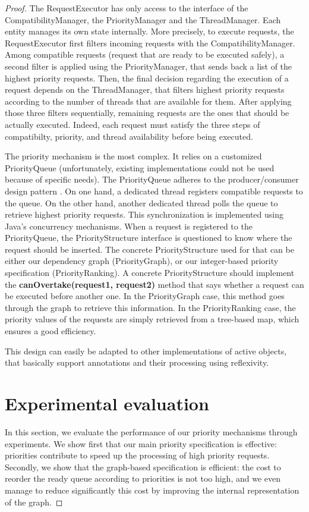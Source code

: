 \documentclass[11pt]{report}
\begin{document}
\begin{proof}
The RequestExecutor has only access to the interface of the CompatibilityManager, the PriorityManager and the ThreadManager. Each entity manages its own state internally. More precisely, to execute requests, the RequestExecutor first filters incoming requests with the CompatibilityManager. Among compatible requests (request that are ready to be executed safely), a second filter is applied using the PriorityManager, that sends back a list of the highest priority requests. Then, the final decision regarding the execution of a request depends on the ThreadManager, that filters highest priority requests according to the number of threads that are available for them. After applying those three filters sequentially, remaining requests are the ones that should be actually executed. Indeed, each request must satisfy the three steps of compatibilty, priority, and thread availability before being executed. 

The priority mechanism is the most complex. It relies on a customized PriorityQueue (unfortunately, existing implementations could not be used because of specific needs). The PriorityQueue adheres to the producer/consumer design pattern \cite{ref:producerconsumer}. On one hand, a dedicated thread registers compatible requests to the queue. On the other hand, another dedicated thread polls the queue to retrieve highest priority requests. This synchronization is implemented using Java's concurrency mechanisms. When a request is registered to the PriorityQueue, the PriorityStructure interface is questioned to know where the request should be inserted. The concrete PriorityStructure used for that can be either our dependency graph (PriorityGraph), or our integer-based priority specification (PriorityRanking). A concrete PriorityStructure should implement the \textbf{canOvertake(request1, request2)} method that says whether a request can be executed before another one. In the PriorityGraph case, this method goes through the graph to retrieve this information. In the PriorityRanking case, the priority values of the requests are simply retrieved from a tree-based map, which ensures a good efficiency.

This design can easily be adapted to other implementations of active objects, that basically support annotations and their processing using reflexivity. 


\section{Experimental evaluation}\label{sec:experiments}
In this section, we evaluate the performance of our priority mechanisms through experiments. 
We show first that our main priority specification is effective: priorities contribute to speed up the processing of high priority requests. Secondly, we show that the graph-based specification is efficient: the cost to reorder the ready queue according to priorities is not too high, and we even manage to reduce significantly this cost by improving the internal representation of the graph.


\end{proof}
\end{document}
